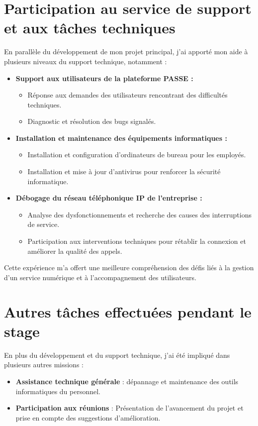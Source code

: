 \section{Participation au service de support et aux tâches techniques}
En parallèle du développement de mon projet principal, j’ai apporté mon aide à plusieurs niveaux du support technique, notamment :
\begin{itemize}
    \item \textbf{Support aux utilisateurs de la plateforme PASSE :} 
    \begin{itemize}
        \item Réponse aux demandes des utilisateurs rencontrant des difficultés techniques.
        \item Diagnostic et résolution des bugs signalés.
    \end{itemize}
    \item \textbf{Installation et maintenance des équipements informatiques :} \begin{itemize}
        \item Installation et configuration d’ordinateurs de bureau pour les employés.
        \item Installation et mise à jour d’antivirus pour renforcer la sécurité informatique.
    \end{itemize}
    \item \textbf{Débogage du réseau téléphonique IP de l’entreprise :} \begin{itemize}
        \item Analyse des dysfonctionnements et recherche des causes des interruptions de service.
        \item Participation aux interventions techniques pour rétablir la connexion et améliorer la qualité des appels.
    \end{itemize}
\end{itemize}

Cette expérience m’a offert une meilleure compréhension des défis liés à la gestion d’un service numérique et à l’accompagnement des utilisateurs.
\section{Autres tâches effectuées pendant le stage}
En plus du développement et du support technique, j’ai été impliqué dans plusieurs autres missions :
\begin{itemize}
    \item \textbf{Assistance technique générale} : dépannage et maintenance des outils informatiques du personnel.
  
    \item \textbf{Participation aux réunions }: Présentation de l’avancement du projet et prise en compte des suggestions d’amélioration.
\end{itemize}
